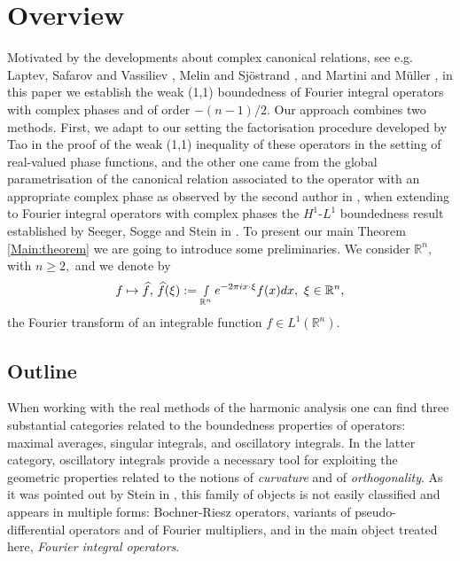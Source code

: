 \documentclass[12pt, reqno]{amsart}
\theoremstyle{definition}
\theoremstyle{remark}
\numberwithin{equation}{section}
\begin{document}
\allowdisplaybreaks






\tableofcontents





\section{Overview} Motivated by the developments about complex canonical relations, see e.g. Laptev, Safarov and Vassiliev \cite{Laptev:Safarov:Vassiliev}, Melin and Sj\"ostrand \cite{Melin:Sjostrand1975}, and Martini and M\"uller \cite{MMNG2023}, 
in this paper we establish the weak (1,1) boundedness of Fourier integral operators with complex phases and of order $-(n-1)/2.$ Our approach combines two methods. First, we adapt to our setting the factorisation procedure developed by Tao \cite{Tao} in the proof of the weak (1,1) inequality of these operators in the setting of real-valued phase functions, and the other one came from the global parametrisation of the canonical relation associated to the operator with an appropriate complex phase as observed by the second author in \cite{Ruzhansky:CWI-book}, when extending to Fourier integral operators with complex phases the $H^1$-$L^1$ boundedness result established by Seeger, Sogge and Stein in \cite{SSS}. To present our main Theorem \ref{Main:theorem} we are going to introduce some preliminaries. We consider $\mathbb{R}^n,$ with $n\geq 2,$ and we denote by $$f\mapsto \widehat{f},\,\widehat{f}(\xi):=\smallint_{\mathbb{R}^n} e^{-2\pi ix\cdot \xi}f(x)dx,\,\,\xi\in \mathbb{R}^n,$$ the Fourier transform of an integrable function $f\in L^1(\mathbb{R}^n).$

\subsection{Outline} When working with the real methods of the harmonic analysis one can find three substantial categories related to the boundedness properties of operators: maximal averages, singular integrals, and oscillatory integrals.  In the latter category, oscillatory integrals provide a necessary tool for exploiting the geometric properties related to the notions of {\it curvature} and of {\it orthogonality}. As it was pointed out by Stein in \cite{SteinBook1993}, this family of objects is not easily classified and appears in multiple forms: Bochner-Riesz operators, variants of pseudo-differential operators and of Fourier multipliers, and in the main object treated here, {\it Fourier integral operators}. 
\end{document}
